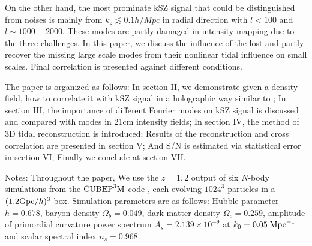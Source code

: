 On the other hand, the most prominate kSZ signal that could be distinguished from noises  
is mainly from $k_z\lesssim0.1 h/Mpc$ in radial direction 
with $l < 100$ and $l \sim 1000-2000$. 
These modes are partly damaged in intensity mapping due to the three challenges. 
In this paper, we discuss the 
influence of the lost 
and partly recover the missing large scale modes 
from their nonlinear tidal influence on small scales\cite{2012:pen,2015:zhu}. 
Final correlation is presented against different conditions.

The paper is organized as follows: 
In section II, we demonstrate given a density field, how to correlate it with kSZ signal in a holographic way similar to \cite{Shao11}; 
In section III, the importance of different Fourier modes on kSZ signal 
is discussed and compared with modes in 21cm intensity fields;
In section IV, the method of 3D tidal reconstruction is introduced; 
Results of the reconstruction and cross correlation are presented in section V; 
And S/N is estimated via statistical error in section VI;
Finally we conclude at section VII.


Notes: 
Throughout the paper, We use the $z=1,2$ output of six $N$-body simulations from the
$\mathrm{CUBEP}^3\mathrm{M}$ code \cite{2013:code}, each evolving $1024^3$ particles in a $(1.2\mathrm{Gpc}/h)^3$ box. 
Simulation parameters are as follows: Hubble parameter $h=0.678$, baryon
density $\Omega_{b}=0.049$, dark matter density $\Omega_{c}=0.259$,
amplitude of primordial curvature power spectrum $A_s=2.139\times10^{-9}$ at 
$k_0=0.05\;\mathrm{Mpc}^{-1}$ and scalar spectral index $n_s=0.968$.
